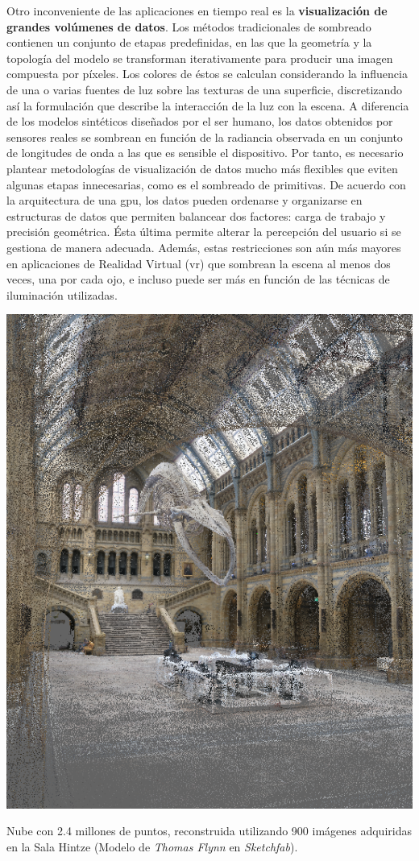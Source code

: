 Otro inconveniente de las aplicaciones en tiempo real es la \textbf{visualización de grandes volúmenes de datos}. Los métodos tradicionales de sombreado contienen un conjunto de etapas predefinidas, en las que la geometría y la topología del modelo se transforman iterativamente para producir una imagen compuesta por píxeles. Los colores de éstos se calculan considerando la influencia de una o varias fuentes de luz sobre las texturas de una superficie, discretizando así la formulación que describe la interacción de la luz con la escena. A diferencia de los modelos sintéticos diseñados por el ser humano, los datos obtenidos por sensores reales se sombrean en función de la radiancia observada en un conjunto de longitudes de onda a las que es sensible el dispositivo. Por tanto, es necesario plantear metodologías de visualización de datos mucho más flexibles que eviten algunas etapas innecesarias, como es el sombreado de primitivas. De acuerdo con la arquitectura de una \acrshort{gpu}, los datos pueden ordenarse y organizarse en estructuras de datos que permiten balancear dos factores: carga de trabajo y precisión geométrica. Ésta última permite alterar la percepción del usuario si se gestiona de manera adecuada. Además, estas restricciones son aún más mayores en aplicaciones de Realidad Virtual (\acrshort{vr}) que sombrean la escena al menos dos veces, una por cada ojo, e incluso puede ser más en función de las técnicas de iluminación utilizadas.
\begin{marginfigure}[-7.5cm]
	\includegraphics{figs/introduction/hintze.png}
	\caption{Nube con 2.4 millones de puntos, reconstruida utilizando 900 imágenes adquiridas en la Sala Hintze (Modelo de \textit{Thomas Flynn} en \textit{Sketchfab}).  }
	\label{fig:hintze_hall_spanish}
\end{marginfigure}

